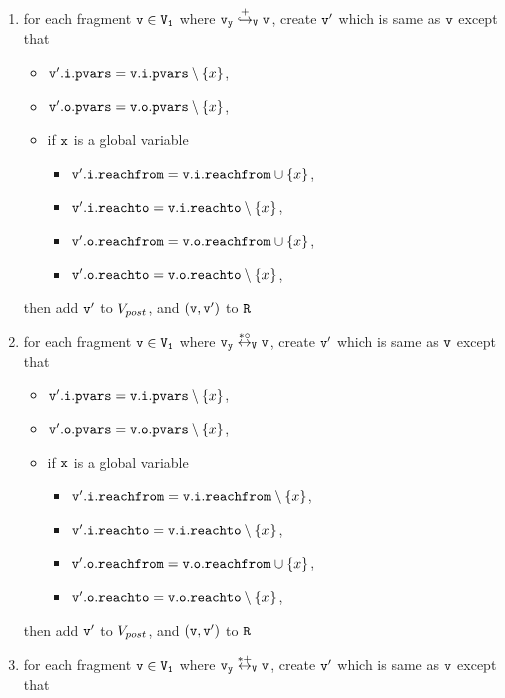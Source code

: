 \begin{itemize}
\begin{enumerate}
\item for each fragment $\tt v \in V_1$ where $\tt \mathtt{v}_y \overset{+}\hookrightarrow_{V} v$, create $\tt v'$ which is same as $\tt v$ except that
\begin{itemize}
\item $\mathtt{v}'.\mathtt{i}.\mathtt{pvars} = \mathtt{v}.\mathtt{i}.\mathtt{pvars} \setminus \left\{x\right\}$,
\item $\mathtt{v}'.\mathtt{o}.\mathtt{pvars} = \mathtt{v}.\mathtt{o}.\mathtt{pvars} \setminus \left\{x\right\}$,
\item if $\tt x$ is a global variable
\begin{itemize}
\item $\mathtt{v}'.\mathtt{i}.\mathtt{reachfrom} = \mathtt{v}.\mathtt{i}.\mathtt{reachfrom} \cup \left\{x\right\}$,
\item $\mathtt{v}'.\mathtt{i}.\mathtt{reachto} = \mathtt{v}.\mathtt{i}.\mathtt{reachto} \setminus \left\{x\right\}$,
 \item $\mathtt{v}'.\mathtt{o}.\mathtt{reachfrom} = \mathtt{v}.\mathtt{o}.\mathtt{reachfrom} \cup \left\{x\right\}$,
 \item $\mathtt{v}'.\mathtt{o}.\mathtt{reachto} = \mathtt{v}.\mathtt{o}.\mathtt{reachto} \setminus \left\{x\right\}$,
\end{itemize}
\end{itemize}
then add $\tt v'$ to $V_{post}$, and $\tt (v,v')$ to $\tt R$
\item for each fragment $\tt v \in V_1$ where $\tt \mathtt{v}_y \overset{*\circ}\leftrightarrow_{V} v$, create $\tt v'$ which is same as $\tt v$ except that
\begin{itemize}
\item $\mathtt{v}'.\mathtt{i}.\mathtt{pvars} = \mathtt{v}.\mathtt{i}.\mathtt{pvars} \setminus \left\{x\right\}$,
\item $\mathtt{v}'.\mathtt{o}.\mathtt{pvars} = \mathtt{v}.\mathtt{o}.\mathtt{pvars} \setminus \left\{x\right\}$,
\item if $\tt x$ is a global variable
\begin{itemize}
\item $\mathtt{v}'.\mathtt{i}.\mathtt{reachfrom} = \mathtt{v}.\mathtt{i}.\mathtt{reachfrom} \setminus \left\{x\right\}$,
\item $\mathtt{v}'.\mathtt{i}.\mathtt{reachto} = \mathtt{v}.\mathtt{i}.\mathtt{reachto} \setminus \left\{x\right\}$,
\item $\mathtt{v}'.\mathtt{o}.\mathtt{reachfrom} = \mathtt{v}.\mathtt{o}.\mathtt{reachfrom} \cup \left\{x\right\}$,
\item $\mathtt{v}'.\mathtt{o}.\mathtt{reachto} = \mathtt{v}.\mathtt{o}.\mathtt{reachto} \setminus \left\{x\right\}$,
\end{itemize}
\end{itemize}
then add $\tt v'$ to $V_{post}$, and $\tt (v,v')$ to $\tt R$
\item for each fragment $\tt v \in V_1$ where $\tt \mathtt{v}_y \overset{*+}\leftrightarrow_{V} v$, create $\tt v'$ which is same as $\tt v$ except that 

\end{enumerate}
\end{itemize}
